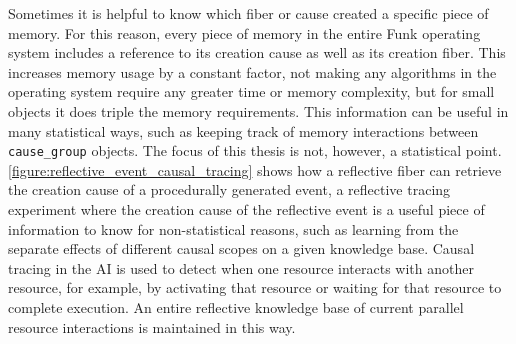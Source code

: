 Sometimes it is helpful to know which fiber or cause created a
specific piece of memory.  For this reason, every piece of memory in
the entire Funk operating system includes a reference to its creation
cause as well as its creation fiber.  This increases memory usage by a
constant factor, not making any algorithms in the operating system
require any greater time or memory complexity, but for small objects
it does triple the memory requirements.  This information can be
useful in many statistical ways, such as keeping track of memory
interactions between {\tt{cause\_group}} objects.  The focus of this
thesis is not, however, a statistical point.
{\mbox{\autoref{figure:reflective_event_causal_tracing}}} shows how a
reflective fiber can retrieve the creation cause of a procedurally
generated event, a reflective tracing experiment where the creation
cause of the reflective event is a useful piece of information to know
for non-statistical reasons, such as learning from the separate
effects of different causal scopes on a given knowledge base.  Causal
tracing in the AI is used to detect when one resource interacts with
another resource, for example, by activating that resource or waiting
for that resource to complete execution.  An entire reflective
knowledge base of current parallel resource interactions is maintained
in this way.
